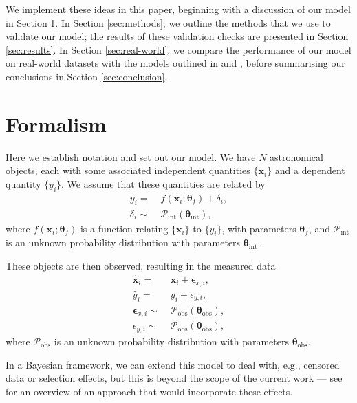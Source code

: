 \documentclass[fleqn,usenatbib]{rasti}
\begin{document}
We implement these ideas in this paper, beginning with a discussion of our model
in Section \ref{sec:formalism}. In Section \ref{sec:methods}, we outline the
methods that we use to validate our model; the results of these validation
checks are presented in Section \ref{sec:results}. In Section
\ref{sec:real-world}, we compare the performance of our model on real-world
datasets with the models outlined in \citet{Kelly:2007} and \citet{Park:2017},
before summarising our conclusions in Section \ref{sec:conclusion}.

\section{Formalism}
\label{sec:formalism}

Here we establish notation and set out our model. We
have $N$ astronomical objects, each with some associated independent quantities
$\{\boldsymbol{x}_i\}$ and a dependent quantity $\{y_i\}$. We assume that these
quantities are related by
\begin{align}
    y_i =&\; f(\boldsymbol{x}_i; \boldsymbol{\theta}_f) + \delta_i, \\
    \delta_i \sim&\; \mathcal{P}_{\text{int}} \left( \boldsymbol{\theta}_{\text{int}} \right),
\end{align}
where $f(\boldsymbol{x}_i; \boldsymbol{\theta}_f)$ is a function relating
$\{\boldsymbol{x}_i\}$ to $\{y_i\}$, with parameters $\boldsymbol{\theta}_f$,
and $\mathcal{P}_{\text{int}}$ is an unknown probability distribution with
parameters $\boldsymbol{\theta}_{\text{int}}$.

These objects are then observed, resulting in the measured
data
\begin{align}
    \hat{\boldsymbol{x}}_i =&\; \boldsymbol{x}_i + \boldsymbol{\epsilon}_{x,i}, \\
    \hat{y}_i =&\; y_i + \epsilon_{y,i}, \\
    \boldsymbol{\epsilon}_{x,i} \sim&\; \mathcal{P}_{\text{obs}} \left( \boldsymbol{\theta}_{\text{obs}} \right), \\
    \epsilon_{y,i} \sim&\; \mathcal{P}_{\text{obs}} \left( \boldsymbol{\theta}_{\text{obs}} \right),
\end{align}
where $\mathcal{P}_{\text{obs}}$ is an unknown probability distribution with
parameters $\boldsymbol{\theta}_{\text{obs}}$.

In a Bayesian framework, we can extend this model to deal with, e.g., censored
data or selection effects, but this is beyond the scope of the current work ---
see \citet{Kelly:2007} for an overview of an approach that would incorporate
these effects.
\end{document}
